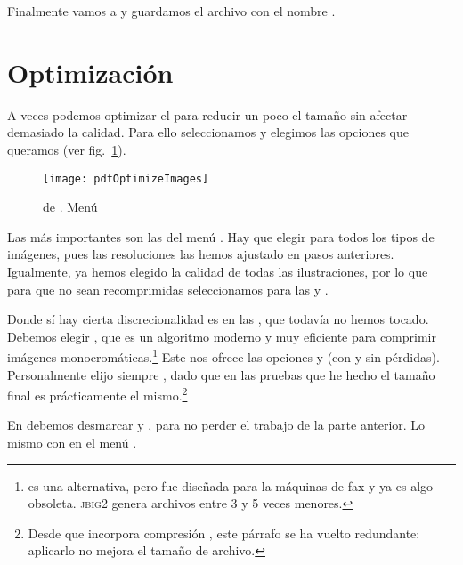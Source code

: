 \documentclass[%
	a5paper,
	10pt,
	twoside,
	openright,
	final,
]{memoir}
\begin{document}
	Finalmente vamos a  y guardamos el archivo con el nombre .

	\section{Optimización\label{sec:pdfOptimize}} A veces podemos optimizar el \pdf para reducir un poco el tamaño sin afectar demasiado la calidad. Para ello seleccionamos  y elegimos las opciones que queramos (ver fig.~\ref{fig:pdfOptimizeImages}).

	\begin{figure}
		\texttt{[image: pdfOptimizeImages]}
		\caption[PDF Optimizer de \acrobat.]{ de \acrobat. Menú \label{fig:pdfOptimizeImages}}
	\end{figure}

	Las más importantes son las del menú . Hay que elegir  para todos los tipos de imágenes, pues las resoluciones las hemos ajustado en pasos anteriores. Igualmente, ya hemos elegido la calidad de todas las ilustraciones, por lo que para que no sean recomprimidas seleccionamos  para las  y .

	Donde sí hay cierta discrecionalidad es en las , que todavía no hemos tocado. Debemos elegir , que es un algoritmo moderno y muy eficiente para comprimir imágenes monocromáticas.\footnote{ es una alternativa, pero fue diseñada para la máquinas de fax y ya es algo obsoleta. \textsc{jbig2} genera archivos entre 3 y 5 veces menores.} Este nos ofrece las opciones  y  (con y sin pérdidas). Personalmente elijo siempre , dado que en las pruebas que he hecho el tamaño final es prácticamente el mismo.\footnote{Desde que \abby incorpora compresión \jbig, este párrafo se ha vuelto redundante: aplicarlo no mejora el tamaño de archivo.}

	En  debemos desmarcar  y , para no perder el trabajo de la parte anterior. Lo mismo con  en el menú .
\end{document}
